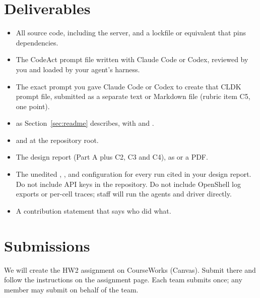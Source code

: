 \documentclass[9pt,letterpaper]{article}
\begin{document}
\section{Deliverables}
\begin{itemize}
\item All source code, including the server, and a lockfile or equivalent that
  pins dependencies.
\item The CodeAct prompt file written with Claude Code or Codex, reviewed by you
  and loaded by your agent's harness.
\item The exact prompt you gave Claude Code or Codex to create that CLDK prompt
  file, submitted as a separate text or Markdown file (rubric item C5, one point).
\item {} as Section~\ref{sec:readme} describes, with
   and .
\item {} and  at the repository root.
\item The design report (Part A plus C2, C3 and C4), as  or a PDF.
\item The unedited , , and configuration for
  every run cited in your design report. Do not include API keys in the repository.
  Do not include OpenShell log exports or per-cell traces; staff will run the
  agents and driver directly.
\item A contribution statement that says who did what.
\end{itemize}

\section{Submissions}

We will create the HW2 assignment on CourseWorks (Canvas). Submit there and follow
the instructions on the assignment page. Each team submits once; any member may
submit on behalf of the team.
\end{document}
